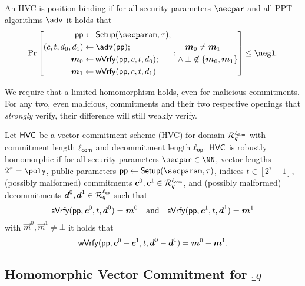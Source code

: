\begin{definition}
  An HVC is position binding if for all security parameters $\secpar$ and all PPT algorithms $\adv$ it holds that
  \[
    \Pr\left[
      \begin{aligned}
      \params\gets&\mspace{\medmuskip}\setup(\secparam,\tau);\\
      (c,t,d_0,d_1) \gets&\mspace{\medmuskip} \adv(\params);\\
      \vec{m}_0 \gets&\mspace{\medmuskip} \wverify(\params,c,t,d_0);\\
      \vec{m}_1 \gets&\mspace{\medmuskip} \wverify(\params,c,t,d_1)
      \end{aligned}:
      \begin{aligned}&\mspace{\medmuskip}\vec{m}_0\neq \vec{m}_1\\ \land&\mspace{\medmuskip}\bot\not\in\{\vec{m}_0,\vec{m}_1\}\end{aligned}
    \right]\leq \negl.
  \]
\end{definition}
We require that a limited homomorphism holds, even for malicious commitments.
For any two, even malicious, commitments and their two respective openings that \emph{strongly} verify, their difference will still weakly verify.

\begin{definition}
  \label{def:malhomhvc}
  Let $\mathsf{HVC}$ be a vector commitment scheme (HVC) for domain $\mathcal{R}^{\ell_{\mathsf{dom}}}_q$ with commitment length ${\ell_{\mathsf{com}}}$ and decommitment length ${\ell_{\mathsf{op}}}$.
  $\mathsf{HVC}$ is robustly homomorphic if for all security parameters $\secpar\in\NN$, vector lengths $2^\tau=\poly$, public parameters $\params\gets\setup(\secparam,\tau)$, indices $t\in[2^\tau-1]$, (possibly malformed) commitments $\boldsymbol{c}^0,\boldsymbol{c}^1 \in \mathcal{R}_q^{\ell_{\mathsf{com}}}$, and (possibly malformed) decommitments $\boldsymbol{d}^0,\boldsymbol{d}^1\in\mathcal{R}_q^{\ell_{\mathsf{op}}}$ such that
  \[
    \mathsf{sVrfy}(\mathsf{pp},\boldsymbol{c}^0, t,\boldsymbol{d}^0)=\boldsymbol{m}^0 \quad \text{and} \quad \mathsf{sVrfy}(\mathsf{pp},\boldsymbol{c}^1, t,\boldsymbol{d}^1)=\boldsymbol{m}^1
  \]
  with $\vec{m}^0,\vec{m}^1\neq \bot$ it holds that
  \[
    \mathsf{wVrfy}(\mathsf{pp},\boldsymbol{c}^0 - \boldsymbol{c}^1, t,\boldsymbol{d}^0 - \boldsymbol{d}^1)=\boldsymbol{m}^0 - \boldsymbol{m}^1.
  \]
\end{definition}


\subsection{Homomorphic Vector Commitment for $\ring_q$}

